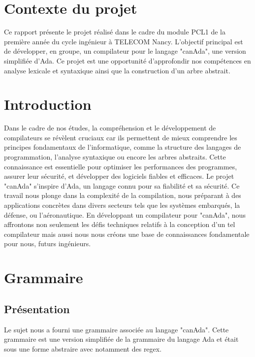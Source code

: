 \documentclass[french,a4paper]{article}
\begin{document}
    \section{Contexte du projet}
    Ce rapport présente le projet réalisé dans le cadre du module PCL1 de la première année du cycle ingénieur à TELECOM Nancy. L'objectif principal est de développer, en groupe, un compilateur pour le langage "canAda", une version simplifiée d'Ada. Ce projet est une opportunité d'approfondir nos compétences en analyse lexicale et syntaxique ainsi que la construction d'un arbre abstrait.

    \section{Introduction}
    Dans le cadre de nos études, la compréhension et le développement de compilateurs se révèlent cruciaux car ils permettent de mieux comprendre les principes fondamentaux de l'informatique, comme la structure des langages de programmation, l'analyse syntaxique ou encore les arbres abstraits. Cette connaissance est essentielle pour optimiser les performances des programmes, assurer leur sécurité, et développer des logiciels fiables et efficaces. Le projet "canAda" s'inspire d'Ada, un langage connu pour sa fiabilité et sa sécurité. Ce travail nous plonge dans la complexité de la compilation, nous préparant à des applications concrètes dans divers secteurs tels que les systèmes embarqués, la défense, ou l'aéronautique. En développant un compilateur pour "canAda", nous affrontons non seulement les défis techniques relatifs à la conception d'un tel compilateur mais aussi nous nous créons une base de connaissances fondamentale pour nous, futurs ingénieurs.

    \section{Grammaire}
    \subsection{Présentation}
    Le sujet nous a fourni une grammaire associée au langage "canAda". Cette grammaire est une version simplifiée de la grammaire du langage Ada et était sous une forme abstraire avec notamment des regex.
\end{document}
